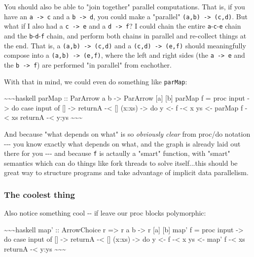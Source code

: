 \documentclass[]{article}
\begin{document}
You should also be able to "join together" parallel computations. That is, if
you have an \texttt{a\ -\textgreater{}\ c} and a \texttt{b\ -\textgreater{}\ d},
you could make a "parallel" \texttt{(a,b)\ -\textgreater{}\ (c,d)}. But what if
I also had a \texttt{c\ -\textgreater{}\ e} and a
\texttt{d\ -\textgreater{}\ f}? I could chain the entire
\texttt{a}-\texttt{c}-\texttt{e} chain and the \texttt{b}-\texttt{d}-\texttt{f}
chain, and perform both chains in parallel and re-collect things at the end.
That is, a \texttt{(a,b)\ -\textgreater{}\ (c,d)} and a
\texttt{(c,d)\ -\textgreater{}\ (e,f)} should meaningfully compose into a
\texttt{(a,b)\ -\textgreater{}\ (e,f)}, where the left and right sides (the
\texttt{a\ -\textgreater{}\ e} and the \texttt{b\ -\textgreater{}\ f}) are
performed "in parallel" from eachother.

With that in mind, we could even do something like \texttt{parMap}:

\textasciitilde{}\textasciitilde{}\textasciitilde{}haskell parMap :: ParArrow a
b -\textgreater{} ParArrow {[}a{]} {[}b{]} parMap f = proc input -\textgreater{}
do case input of {[}{]} -\textgreater{} returnA -\textless{} {[}{]} (x:xs)
-\textgreater{} do y \textless{}- f -\textless{} x ys \textless{}- parMap f
-\textless{} xs returnA -\textless{} y:ys
\textasciitilde{}\textasciitilde{}\textasciitilde{}

And because "what depends on what" is so \emph{obviously clear} from proc/do
notation -\/-\/- you know exactly what depends on what, and the graph is already
laid out there for you -\/-\/- and because \texttt{f} is actaully a "smart"
function, with "smart" semantics which can do things like fork threads to solve
itself...this should be great way to structure programs and take advantage of
implicit data parallelism.

\subsubsection{The coolest thing}

Also notice something cool -\/- if leave our proc blocks polymorphic:

\textasciitilde{}\textasciitilde{}\textasciitilde{}haskell map' :: ArrowChoice r
=\textgreater{} r a b -\textgreater{} r {[}a{]} {[}b{]} map' f = proc input
-\textgreater{} do case input of {[}{]} -\textgreater{} returnA -\textless{}
{[}{]} (x:xs) -\textgreater{} do y \textless{}- f -\textless{} x ys \textless{}-
map' f -\textless{} xs returnA -\textless{} y:ys
\textasciitilde{}\textasciitilde{}\textasciitilde{}
\end{document}

